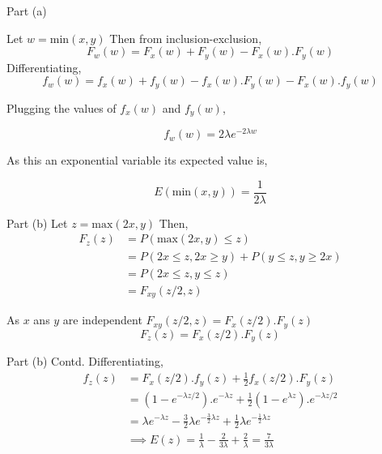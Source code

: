\documentclass{beamer}
\begin{document}
\begin{frame}{Part (a)}

    Let $w = \text{min}(x,y)$
    Then from inclusion-exclusion,
    \begin{equation}
        F_w(w) = F_x(w) + F_y(w) - F_x(w).F_y(w)
    \end{equation}
    Differentiating,
    \begin{equation}
        f_w(w) = f_x(w) + f_y(w) - f_x(w).F_y(w) - F_x(w).f_y(w)
    \end{equation}
    
    Plugging the values of $f_x(w)$ and $f_y(w)$,
    
    \begin{equation}
        f_w(w) = 2\lambda e^{-2\lambda w}
    \end{equation}
    
    As this an exponential variable its expected value is,
    
    \begin{equation}
        E(\text{min}(x,y)) = \frac{1}{2\lambda}
    \end{equation}
    
\end{frame} 

\begin{frame}{Part (b)}
    Let $z = \text{max}(2x,y)$
    Then,
    \begin{align}
        F_z(z) &= P(\text{max}(2x, y) \leq z) \\
        &= P(2x \leq z, 2x \geq y) + P(y \leq z, y \geq 2x) \\
        &= P(2x \leq z, y \leq z) \\
        &= F_{xy}(z/2 , z)
    \end{align}
    
    As $x$ ans $y$ are independent $F_{xy}(z/2 , z) = F_x(z/2).F_y(z)$
    \begin{equation}
        F_z(z) = F_x(z/2).F_y(z)
    \end{equation}
\end{frame}

\begin{frame}{Part (b) Contd.}
    Differentiating, 
    \begin{align}
        f_z(z) &= F_x(z/2).f_y(z) + \frac{1}{2} f_x(z/2).F_y(z)\\
        &= \left(1 - e^{-\lambda z/2} \right).e^{-\lambda z} + \frac{1}{2}\left(1 - e^{\lambda z} \right).e^{-\lambda z/2}\\
        &= \lambda e^{-\lambda z} - \frac{3}{2}\lambda e^{-\frac{3}{2}\lambda z} + \frac{1}{2}\lambda e^{-\frac{1}{2}\lambda z} \\
        &\implies E(z) = \frac{1}{\lambda} - \frac{2}{3\lambda} + \frac{2}{\lambda} = \frac{7}{3\lambda}
    \end{align}
\end{frame}
\end{document}
